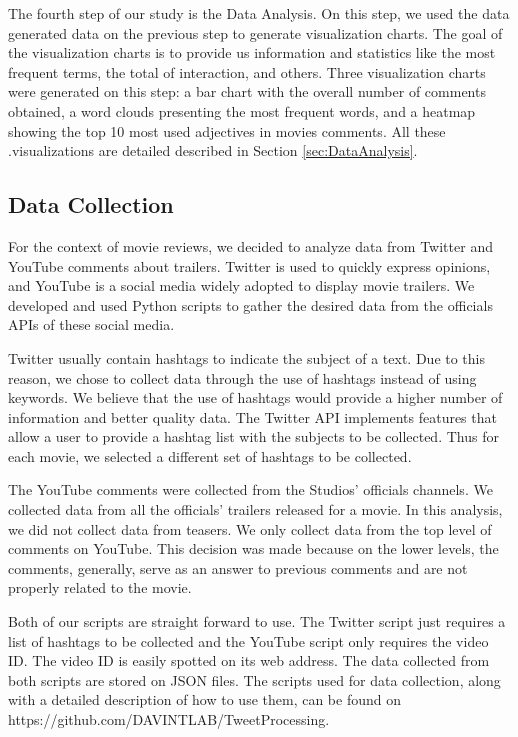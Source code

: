 The fourth step of our study is the Data Analysis. On this step, we used the data generated data on the previous step to generate visualization charts. The goal of the visualization charts is to provide us information and statistics like the most frequent terms, the total of interaction, and others. Three visualization charts were generated on this step: a bar chart with the overall number of comments obtained, a word clouds presenting the most frequent words, and a heatmap showing the top 10 most used adjectives in movies comments. All these .visualizations are detailed described in Section \ref{sec:DataAnalysis}.


\subsection{Data Collection}
\label{sec:DataCollection}

For the context of movie reviews, we decided to analyze data from Twitter and YouTube comments about trailers. Twitter is used to quickly express opinions, and YouTube is a social media widely adopted to display movie trailers. We developed and used Python scripts to gather the desired data from the officials APIs of these social media. 

Twitter usually contain hashtags to indicate the subject of a text. Due to this reason, we chose to collect data through the use of hashtags instead of using keywords. We believe that the use of hashtags would provide a higher number of information and better quality data. The Twitter API implements features that allow a  user to provide a hashtag list with the subjects to be collected. Thus for each movie, we selected a different set of hashtags to be collected. 

The YouTube comments were collected from the Studios' officials channels. We collected data from all the officials' trailers released for a movie. In this analysis, we did not collect data from teasers. We only collect data from the top level of comments on YouTube. This decision was made because on the lower levels, the comments, generally, serve as an answer to previous comments and are not properly related to the movie. 

Both of our scripts are straight forward to use. The Twitter script just requires a list of hashtags to be collected and the YouTube script only requires the video ID. The video ID is easily spotted on its web address. The data collected from both scripts are stored on JSON files. The scripts used for data collection, along with a detailed description of how to use them, can be found on https://github.com/DAVINTLAB/TweetProcessing.

